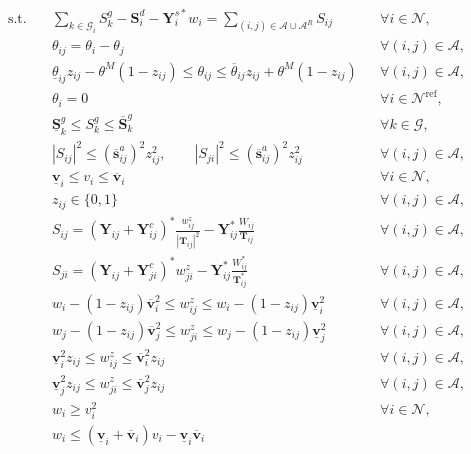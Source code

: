\documentclass{article}
\begin{document}
\begin{equation}
\begin{aligned}
\text{s.t.}\quad
& \sum_{k\in\mathcal{G}_i} S_k^g - \boldsymbol{S}_i^d - \boldsymbol{Y}_i^{s*} w_i
= \sum_{(i,j)\in\mathcal{A}\cup\mathcal{A}^R} S_{ij}
&& \forall i\in\mathcal{N}, \\
& \theta_{ij} = \theta_i - \theta_j
&& \forall (i,j)\in\mathcal{A}, \\
& \underline{\theta}_{ij} z_{ij} - \theta^{M}(1-z_{ij})
\le \theta_{ij} \le
\overline{\theta}_{ij} z_{ij} + \theta^{M}(1-z_{ij})
&& \forall (i,j)\in\mathcal{A}, \\
& \theta_i = 0
&& \forall i\in\mathcal{N}^{\mathrm{ref}}, \\
& \underline{\boldsymbol{S}}_k^g \le S_k^g \le \overline{\boldsymbol{S}}_k^g
&& \forall k\in\mathcal{G}, \\
& |S_{ij}|^2 \le (\overline{\boldsymbol{s}}_{ij}^a)^2 z_{ij}^2,\qquad
|S_{ji}|^2 \le (\overline{\boldsymbol{s}}_{ij}^a)^2 z_{ij}^2
&& \forall (i,j)\in\mathcal{A}, \\
& \underline{\boldsymbol{v}}_i \le v_i \le \overline{\boldsymbol{v}}_i
&& \forall i\in\mathcal{N}, \\
& z_{ij}\in\{0,1\}
&& \forall (i,j)\in\mathcal{A}, \\
& S_{ij} = (\boldsymbol{Y}_{ij}+\boldsymbol{Y}_{ij}^c)^*\frac{w_{ij}^z}{|\boldsymbol{T}_{ij}|^2}
- \boldsymbol{Y}_{ij}^* \frac{W_{ij}}{\boldsymbol{T}_{ij}}
&& \forall (i,j)\in\mathcal{A}, \\
& S_{ji} = (\boldsymbol{Y}_{ij}+\boldsymbol{Y}_{ji}^c)^* w_{ji}^z
- \boldsymbol{Y}_{ij}^* \frac{W_{ij}^*}{\boldsymbol{T}_{ij}^*}
&& \forall (i,j)\in\mathcal{A}, \\
& w_i - (1-z_{ij})\overline{\boldsymbol{v}}_i^2 \le w_{ij}^z \le w_i - (1-z_{ij})\underline{\boldsymbol{v}}_i^2
&& \forall (i,j)\in\mathcal{A}, \\
& w_j - (1-z_{ij})\overline{\boldsymbol{v}}_j^2 \le w_{ji}^z \le w_j - (1-z_{ij})\underline{\boldsymbol{v}}_j^2
&& \forall (i,j)\in\mathcal{A}, \\
& \underline{\boldsymbol{v}}_i^2 z_{ij} \le w_{ij}^z \le \overline{\boldsymbol{v}}_i^2 z_{ij}
&& \forall (i,j)\in\mathcal{A}, \\
& \underline{\boldsymbol{v}}_j^2 z_{ij} \le w_{ji}^z \le \overline{\boldsymbol{v}}_j^2 z_{ij}
&& \forall (i,j)\in\mathcal{A}, \\
& w_i \ge v_i^2
&& \forall i\in\mathcal{N}, \\
& w_i \le (\underline{\boldsymbol{v}}_i+\overline{\boldsymbol{v}}_i)v_i - \underline{\boldsymbol{v}}_i\overline{\boldsymbol{v}}_i

\end{aligned}
\end{equation}
\end{document}
